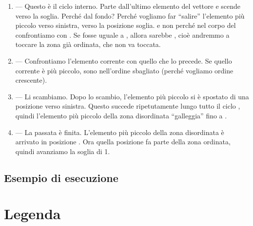 \begin{soluzione}
\begin{enumerate}
  \item {} --- Questo \`e il ciclo interno.
  Parte dall'ultimo elemento del vettore e scende verso la soglia.
  Perch\'e dal fondo? Perch\'e vogliamo far ``salire'' l'elemento pi\`u piccolo verso sinistra,
  verso la posizione soglia.
   e non  perch\'e nel corpo del 
  confrontiamo  con .
  Se  fosse uguale a , allora  sarebbe
  , cio\`e andremmo a toccare la zona gi\`a ordinata, che non va toccata.
  
  \item {} --- Confrontiamo l'elemento corrente con quello che lo precede.
  Se quello corrente \`e pi\`u piccolo, sono nell'ordine sbagliato (perch\'e vogliamo ordine crescente).
  
  \item {} --- Li scambiamo.
  Dopo lo scambio, l'elemento pi\`u piccolo si \`e spostato di una posizione verso sinistra.
  Questo succede ripetutamente lungo tutto il ciclo ,
  quindi l'elemento pi\`u piccolo della zona disordinata ``galleggia'' fino a .
  
  \item {} --- La passata \`e finita.
  L'elemento pi\`u piccolo della zona disordinata \`e arrivato in posizione .
  Ora quella posizione fa parte della zona ordinata, quindi avanziamo la soglia di 1.
\end{enumerate}
\end{soluzione}

\subsection{Esempio di esecuzione}

\section*{Legenda}

